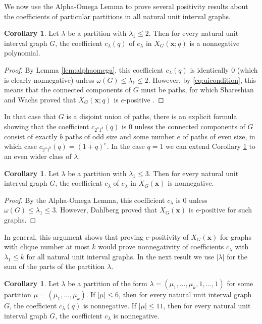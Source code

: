 \documentclass[12pt]{amsart}  %
\theoremstyle{definition}
\newtheorem{corollary}[theorem]{Corollary}
\theoremstyle{remark}
\numberwithin{equation}{section}
\newcommand{\la}{\lambda}
\begin{document}
We now use the Alpha-Omega Lemma to prove several positivity results about the coefficients of particular partitions in all natural unit interval graphs.

\begin{corollary}\label{cor:twocols}
Let $\lambda$ be a partition with $\lambda_1\leq 2$. Then for every natural unit interval graph $G$, the coefficient $c_\lambda(q)$ of $e_\lambda$ in $X_G(\bm x;q)$ is a nonnegative polynomial.
\end{corollary}

\begin{proof}
By Lemma \ref{lem:alphaomega}, this coefficient $c_\lambda(q)$ is identically $0$ (which is clearly nonnegative) unless $\omega(G)\leq \lambda_1\leq 2$. However, by \eqref{eq:uicondition}, this means that the connected components of $G$ must be paths, for which Shareshian and Wachs proved that $X_G(\bm x;q)$ is $e$-positive \cite[Section 5]{chromposquasi}.
\end{proof}

In that case that $G$ is a disjoint union of paths, there is an explicit formula showing that the coefficient $c_{2^a1^b}(q)$ is $0$ unless the connected components of $G$ consist of exactly $b$ paths of odd size and some number $e$ of paths of even size, in which case $c_{2^a1^b}(q)=(1+q)^e$. In the case $q=1$ we can extend Corollary \ref{cor:twocols} to an even wider class of $\la$.

\begin{corollary}
Let $\lambda$ be a partition with $\lambda_1\leq 3$. Then for every natural unit interval graph $G$, the coefficient $c_\lambda$ of $e_\lambda$ in $X_G(\bm x)$ is nonnegative.
\end{corollary}

\begin{proof}
By the Alpha-Omega Lemma, this coefficient $c_\lambda$ is $0$ unless $\omega(G)\leq\lambda_1\leq 3$. However, Dahlberg \cite[Corollary 5.4]{trilad} proved that $X_G(\bm x)$ is $e$-positive for such graphs.
\end{proof}

In general, this argument shows that proving $e$-positivity of $X_G(\bm x)$ for graphs with clique number at most $k$ would prove nonnegativity of coefficients $c_\lambda$ with $\lambda_1\leq k$ for all natural unit interval graphs. In the next result we use $|\la|$ for the sum of the parts of the partition $\la$.

\begin{corollary}
\label{TopCor}
Let $\lambda$ be a partition of the form 
$\la=(\mu_1,\ldots,\mu_k,1,\ldots,1)$ for some partition $\mu=(\mu_1,\ldots,\mu_k)$.
 If $|\mu|\leq 6$, then for every natural unit interval graph $G$, the coefficient $c_\lambda(q)$ is nonnegative. If $|\mu|\leq 11$, then for every natural unit interval graph $G$, the coefficient $c_\lambda$ is nonnegative.
\end{corollary}
\end{document}
